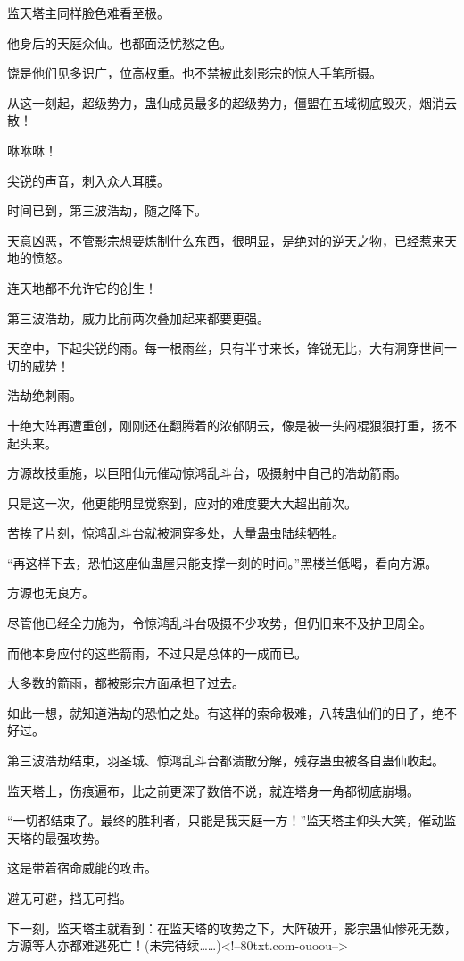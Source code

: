\begin{this_body}
监天塔主同样脸色难看至极。

他身后的天庭众仙。也都面泛忧愁之色。

饶是他们见多识广，位高权重。也不禁被此刻影宗的惊人手笔所摄。

从这一刻起，超级势力，蛊仙成员最多的超级势力，僵盟在五域彻底毁灭，烟消云散！

咻咻咻！

尖锐的声音，刺入众人耳膜。

时间已到，第三波浩劫，随之降下。

天意凶恶，不管影宗想要炼制什么东西，很明显，是绝对的逆天之物，已经惹来天地的愤怒。

连天地都不允许它的创生！

第三波浩劫，威力比前两次叠加起来都要更强。

天空中，下起尖锐的雨。每一根雨丝，只有半寸来长，锋锐无比，大有洞穿世间一切的威势！

浩劫绝刺雨。

十绝大阵再遭重创，刚刚还在翻腾着的浓郁阴云，像是被一头闷棍狠狠打重，扬不起头来。

方源故技重施，以巨阳仙元催动惊鸿乱斗台，吸摄射中自己的浩劫箭雨。

只是这一次，他更能明显觉察到，应对的难度要大大超出前次。

苦挨了片刻，惊鸿乱斗台就被洞穿多处，大量蛊虫陆续牺牲。

“再这样下去，恐怕这座仙蛊屋只能支撑一刻的时间。”黑楼兰低喝，看向方源。

方源也无良方。

尽管他已经全力施为，令惊鸿乱斗台吸摄不少攻势，但仍旧来不及护卫周全。

而他本身应付的这些箭雨，不过只是总体的一成而已。

大多数的箭雨，都被影宗方面承担了过去。

如此一想，就知道浩劫的恐怕之处。有这样的索命极难，八转蛊仙们的日子，绝不好过。

第三波浩劫结束，羽圣城、惊鸿乱斗台都溃散分解，残存蛊虫被各自蛊仙收起。

监天塔上，伤痕遍布，比之前更深了数倍不说，就连塔身一角都彻底崩塌。

“一切都结束了。最终的胜利者，只能是我天庭一方！”监天塔主仰头大笑，催动监天塔的最强攻势。

这是带着宿命威能的攻击。

避无可避，挡无可挡。

下一刻，监天塔主就看到：在监天塔的攻势之下，大阵破开，影宗蛊仙惨死无数，方源等人亦都难逃死亡！(未完待续……)<!--80txt.com-ouoou-->


\end{this_body}
